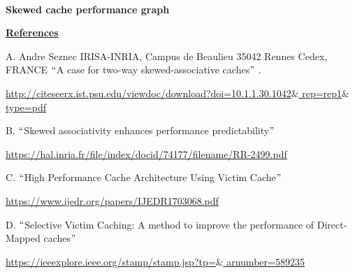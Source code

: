 \documentclass[12pt]{article}
\begin{document}

{\fontsize{22pt}{26.4pt}\selectfont \ \  \par}\par

{\fontsize{10pt}{12.0pt}\selectfont \textbf{Skewed cache performance graph} \tab \tab \tab \par}\par

\tab 
\vspace{\baselineskip}
\vspace{\baselineskip}

\vspace{\baselineskip}
{\fontsize{24pt}{28.8pt}\selectfont \textbf{\uline{References}}\par}\par

A. Andre Seznec IRISA-INRIA, Campus de Beaulieu 35042 Rennes Cedex, FRANCE $``$A case for two-way skewed-associative caches$"$ .\par

\href{http://citeseerx.ist.psu.edu/viewdoc/download?doi=10.1.1.30.1042&rep=rep1&type=pdf}{\textcolor[HTML]{1155CC}{\uline{http://citeseerx.ist.psu.edu/viewdoc/download?doi=10.1.1.30.1042$\&$ rep=rep1$\&$ type=pdf}}}\par

B. $``$Skewed associativity enhances performance predictability$"$ \par

\href{https://hal.inria.fr/file/index/docid/74177/filename/RR-2499.pdf}{\textcolor[HTML]{1155CC}{\uline{https://hal.inria.fr/file/index/docid/74177/filename/RR-2499.pdf}}}\par

C. $``$High Performance Cache Architecture Using Victim Cache$"$ \par

\href{https://www.ijedr.org/papers/IJEDR1703068.pdf}{\textcolor[HTML]{1155CC}{\uline{https://www.ijedr.org/papers/IJEDR1703068.pdf}}}\par

D. $``$Selective Victim Caching: A method to improve the performance of Direct-Mapped caches$"$ \par

\href{https://ieeexplore.ieee.org/stamp/stamp.jsp?tp=&arnumber=589235}{\textcolor[HTML]{1155CC}{\uline{https://ieeexplore.ieee.org/stamp/stamp.jsp?tp=$\&$ arnumber=589235}}}\par


\vspace{\baselineskip}

\vspace{\baselineskip}

\vspace{\baselineskip}

\vspace{\baselineskip}

\printbibliography
\end{document}
